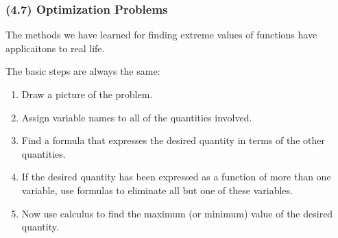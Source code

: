\begin{frame}
\frametitle{(4.7) Optimization Problems}
The methods we have learned for finding extreme values of functions have applicaitons to real life.  

The basic steps are always the same:
\begin{enumerate}
\item  Draw a picture of the problem.
\item  Assign variable names to all of the quantities involved.
\item  Find a formula that expresses the desired quantity in terms of the other quantities.
\item  If the desired quantity has been expressed as a function of more than one variable, use formulas to eliminate all but one of these variables.
\item  Now use calculus to find the maximum (or minimum) value of the desired quantity.
\end{enumerate}
\end{frame}

